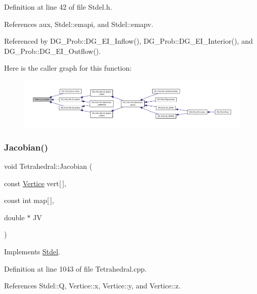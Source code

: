 Definition at line 42 of file Stdel.\+h.



References aux, Stdel\+::emapi, and Stdel\+::emapv.



Referenced by D\+G\+\_\+\+Prob\+::\+D\+G\+\_\+\+E\+I\+\_\+\+Inflow(), D\+G\+\_\+\+Prob\+::\+D\+G\+\_\+\+E\+I\+\_\+\+Interior(), and D\+G\+\_\+\+Prob\+::\+D\+G\+\_\+\+E\+I\+\_\+\+Outflow().

Here is the caller graph for this function\+:
\nopagebreak
\begin{figure}[H]
\begin{center}
\leavevmode
\includegraphics[width=350pt]{classStdel_abb022f0ad81707e11e3a3091d2d87c46_icgraph}
\end{center}
\end{figure}
\mbox{\label{classTetrahedral_abe0c60a6df85f832c81876468fe39c2e}} 
\subsubsection{\texorpdfstring{Jacobian()}{Jacobian()}}
{\footnotesize\ttfamily void Tetrahedral\+::\+Jacobian (\begin{DoxyParamCaption}\item[{const \hyperlink{structVertice}{Vertice}}]{vert\mbox{[}$\,$\mbox{]},  }\item[{const int}]{map\mbox{[}$\,$\mbox{]},  }\item[{double $\ast$}]{JV }\end{DoxyParamCaption})\hspace{0.3cm}{\ttfamily [virtual]}}



Implements \hyperlink{classStdel_a953ff994c1bb423245aff079932c648f}{Stdel}.



Definition at line 1043 of file Tetrahedral.\+cpp.



References Stdel\+::Q, Vertice\+::x, Vertice\+::y, and Vertice\+::z.

